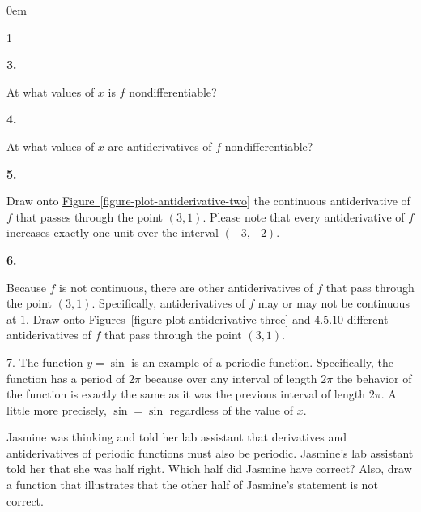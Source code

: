 \documentclass[12pt,]{book}
\theoremstyle{plain}
\theoremstyle{definition}
\numberwithin{equation}{section}
\newenvironment{exercisegroup}%
{\medskip\noindent}%
{\par\bigskip}%
\newlength{\exercisegroupindent}%
\newlength{\exercisegroupitemwidth}%
\newenvironment{exercisegrouplist}%
{\vspace{-\partopsep}%
\begin{adjustwidth}{\exercisegroupindent}{0em}}%
{\end{adjustwidth}%
\vspace{-\partopsep}%
\vspace{\baselineskip}}%
\newenvironment{exercisegroupbycol}[1]%
{\begin{exercisegrouplist}%
\vspace{-\multicolsep}%
\begin{multicols}{#1}%
\setlength{\parindent}{0em}%
\setlength{\exercisegroupitemwidth}{\linewidth}}%
{\end{multicols}%
\vspace{-\multicolsep}%
\end{exercisegrouplist}}%
\newenvironment{exercisegroupitem}[1]%
{\begin{minipage}[t]{\exercisegroupitemwidth}
\vspace{0pt}%
{\bfseries#1}%
\rule{0pt}{\baselineskip}}{\strut%
\end{minipage}%
\hspace{\columnsep}}%
\providecommand\phantomsection{}
\newcommand{\fe}[2]{\mathop{{#1}{\left(#2\right)}}}
\newcommand{\ointerval}[2]{\left(#1,#2\right)}
\newcommand{\point}[2]{\left(#1,#2\right)}
\begin{document}
\begin{exercisegroup}
\begin{exercisegroupbycol}{1}
\begin{exercisegroupitem}{3. }\phantomsection\hypertarget{exercise-186}{\null}
At what values of \(x\) is \(f\) nondifferentiable?%
\end{exercisegroupitem}%
\par%
\begin{exercisegroupitem}{4. }\phantomsection\hypertarget{exercise-187}{\null}
At what values of \(x\) are antiderivatives of \(f\) nondifferentiable?%
\end{exercisegroupitem}%
\par%
\begin{exercisegroupitem}{5. }\phantomsection\hypertarget{exercise-188}{\null}
Draw onto \hyperref[figure-plot-antiderivative-two]{Figure~\ref*{figure-plot-antiderivative-two}} the continuous antiderivative of \(f\) that passes through the point \(\point{3}{1}\).  Please note that every antiderivative of \(f\) increases exactly one unit over the interval \(\ointerval{-3}{-2}\).%
\end{exercisegroupitem}%
\par%
\begin{exercisegroupitem}{6. }\phantomsection\hypertarget{exercise-189}{\null}
Because \(f\) is not continuous, there are other antiderivatives of \(f\) that pass through the point \(\point{3}{1}\). Specifically, antiderivatives of \(f\) may or may not be continuous at \(1\).  Draw onto \hyperref[figure-plot-antiderivative-three]{Figures~\ref*{figure-plot-antiderivative-three}} and \hyperref[figure-plot-antiderivative-four]{4.5.10} different antiderivatives of \(f\) that pass through the point \(\point{3}{1}\).%
\end{exercisegroupitem}%
\par%
\end{exercisegroupbycol}%
\end{exercisegroup}%
\begin{exerciselist}
\item[7.]\phantomsection\hypertarget{exercise-190}{\null}The function \(y=\fe{\sin}{x}\) is an example of a periodic function.  Specifically, the function has a period of \(2\pi\) because over any interval of length \(2\pi\) the behavior of the function is exactly the same as it was the previous interval of length \(2\pi\).  A little more precisely, \(\fe{\sin}{x+2\pi}=\fe{\sin}{x}\) regardless of the value of \(x\).%
\par
Jasmine was thinking and told her lab assistant that derivatives and antiderivatives of periodic functions must also be periodic.  Jasmine's lab assistant told her that she was half right.  Which half did Jasmine have correct?  Also, draw a function that illustrates that the other half of Jasmine's statement is not correct.%
\par\smallskip
\end{exerciselist}
\end{document}
